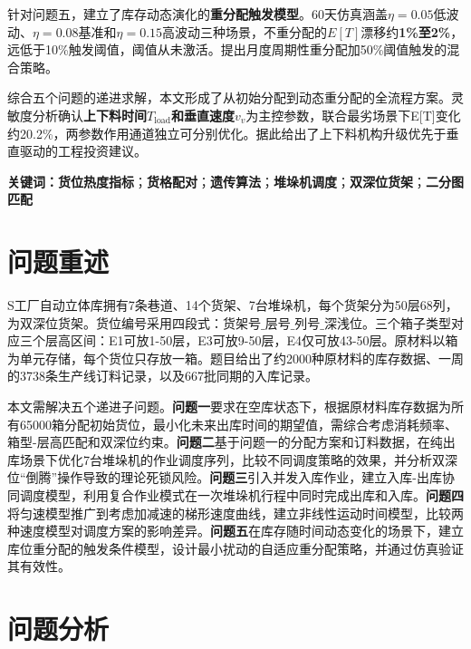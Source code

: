 \documentclass[a4paper]{cumcmthesis}
\begin{document}
{针对问题五，建立了库存动态演化的\textbf{重分配触发模型}。60天仿真涵盖$\eta=0.05$低波动、$\eta=0.08$基准和$\eta=0.15$高波动三种场景，不重分配的$E[T]$漂移约\textbf{1\%至2\%}，远低于10\%触发阈值，阈值从未激活。提出月度周期性重分配加50\%阈值触发的混合策略。

综合五个问题的递进求解，本文形成了从初始分配到动态重分配的全流程方案。灵敏度分析确认\textbf{上下料时间$T_{\text{load}}$和垂直速度$v_v$}为主控参数，联合最劣场景下E[T]变化约20.2\%，两参数作用通道独立可分别优化。据此给出了上下料机构升级优先于垂直驱动的工程投资建议。

\vspace{0.8em}


\noindent\textbf{关键词：}\textbf{货位热度指标}；\textbf{货格配对}；\textbf{遗传算法}；\textbf{堆垛机调度}；\textbf{双深位货架}；\textbf{二分图匹配}
}

\newpage
\setcounter{page}{1}
\pagestyle{fancy}

\section{问题重述}

S工厂自动立体库拥有7条巷道、14个货架、7台堆垛机，每个货架分为50层68列，为双深位货架。货位编号采用四段式：$\text{货架号}\_\text{层号}\_\text{列号}\_\text{深浅位}$。三个箱子类型对应三个层高区间：E1可放1-50层，E3可放9-50层，E4仅可放43-50层。原材料以箱为单元存储，每个货位只存放一箱。题目给出了约2000种原材料的库存数据、一周的3738条生产线订料记录，以及667批同期的入库记录。

本文需解决五个递进子问题。\textbf{问题一}要求在空库状态下，根据原材料库存数据为所有65000箱分配初始货位，最小化未来出库时间的期望值，需综合考虑消耗频率、箱型-层高匹配和双深位约束。\textbf{问题二}基于问题一的分配方案和订料数据，在纯出库场景下优化7台堆垛机的作业调度序列，比较不同调度策略的效果，并分析双深位``倒腾''操作导致的理论死锁风险。\textbf{问题三}引入并发入库作业，建立入库-出库协同调度模型，利用复合作业模式在一次堆垛机行程中同时完成出库和入库。\textbf{问题四}将匀速模型推广到考虑加减速的梯形速度曲线，建立非线性运动时间模型，比较两种速度模型对调度方案的影响差异。\textbf{问题五}在库存随时间动态变化的场景下，建立库位重分配的触发条件模型，设计最小扰动的自适应重分配策略，并通过仿真验证其有效性。

\section{问题分析}
\end{document}
